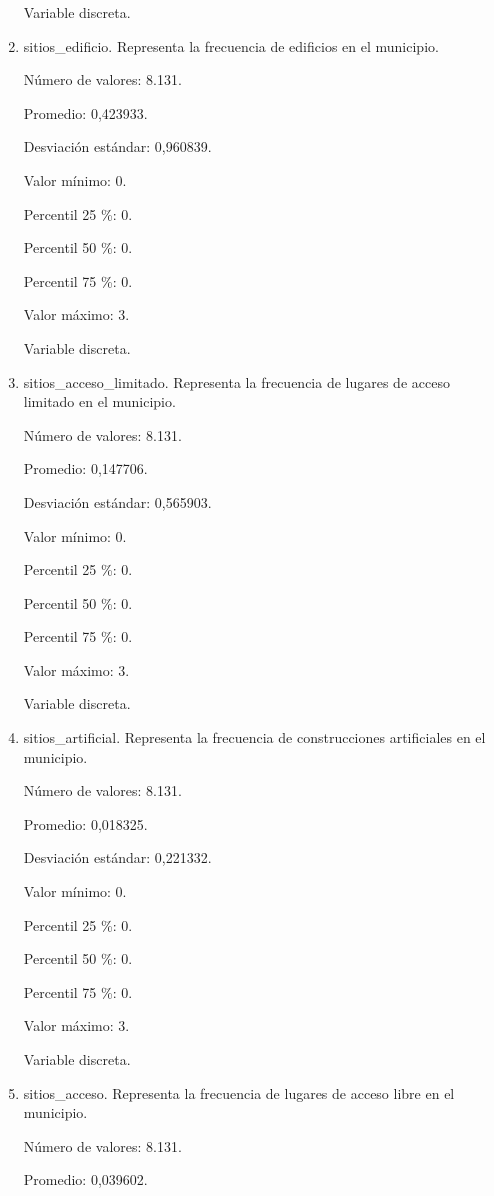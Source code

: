 \begin{enumerate}
	Variable discreta.

	\item sitios\_edificio. Representa la frecuencia de edificios en el municipio.
	
	Número de valores: 8.131.
	
	Promedio: 0,423933.
	
	Desviación estándar: 0,960839.
	
	Valor mínimo: 0.
	
	Percentil 25 \%: 0.
	
	Percentil 50 \%: 0.
	
	Percentil 75 \%: 0.
	
	Valor máximo: 3.
	
	Variable discreta.

	\item sitios\_acceso\_limitado. Representa la frecuencia de lugares de acceso limitado en el municipio.
	
	Número de valores: 8.131.
	
	Promedio: 0,147706.
	
	Desviación estándar: 0,565903.
	
	Valor mínimo: 0.
	
	Percentil 25 \%: 0.
	
	Percentil 50 \%: 0.
	
	Percentil 75 \%: 0.
	
	Valor máximo: 3.
	
	Variable discreta.

	\item sitios\_artificial. Representa la frecuencia de construcciones artificiales en el municipio.
	
	Número de valores: 8.131.
	
	Promedio: 0,018325.
	
	Desviación estándar: 0,221332.
	
	Valor mínimo: 0.
	
	Percentil 25 \%: 0.
	
	Percentil 50 \%: 0.
	
	Percentil 75 \%: 0.
	
	Valor máximo: 3.
	
	Variable discreta.

	\item sitios\_acceso. Representa la frecuencia de lugares de acceso libre en el municipio.
	
	Número de valores: 8.131.
	
	Promedio: 0,039602.
	

\end{enumerate}
